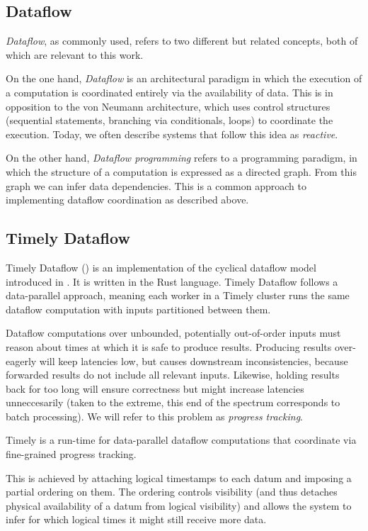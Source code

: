 \documentclass[../index.tex]{subfiles}
\begin{document}
\subsection{Dataflow}

\emph{Dataflow}, as commonly used, refers to two different but related
concepts, both of which are relevant to this work.

On the one hand, \emph{Dataflow} is an architectural paradigm in which
the execution of a computation is coordinated entirely via the
availability of data. This is in opposition to the von Neumann
architecture, which uses control structures (sequential statements,
branching via conditionals, loops) to coordinate the execution. Today,
we often describe systems that follow this idea as \emph{reactive}.

On the other hand, \emph{Dataflow programming} refers to a programming
paradigm, in which the structure of a computation is expressed as a
directed graph. From this graph we can infer data dependencies. This
is a common approach to implementing dataflow coordination as
described above.

\subsection{Timely Dataflow}

Timely Dataflow (\cite{timely}) is an implementation of the cyclical
dataflow model introduced in \cite{murray2013naiad}. It is written in
the Rust language. Timely Dataflow follows a data-parallel approach,
meaning each worker in a Timely cluster runs the same dataflow
computation with inputs partitioned between them.

Dataflow computations over unbounded, potentially out-of-order inputs
must reason about times at which it is safe to produce
results. Producing results over-eagerly will keep latencies low, but
causes downstream inconsistencies, because forwarded results do not
include all relevant inputs. Likewise, holding results back for too
long will ensure correctness but might increase latencies
unneccesarily (taken to the extreme, this end of the spectrum
corresponds to batch processing). We will refer to this problem as
\emph{progress tracking}.

Timely is a run-time for data-parallel dataflow computations that
coordinate via fine-grained progress tracking. 

This is achieved by attaching logical timestamps to each datum and
imposing a partial ordering on them. The ordering controls visibility
(and thus detaches physical availability of a datum from logical
visibility) and allows the system to infer for which logical times it
might still receive more data.
\end{document}
